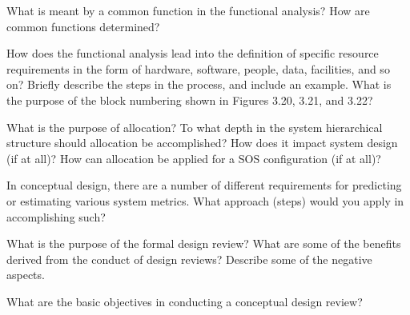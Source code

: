 \begin{exercises}
    \begin{exercise}
    \label{sea-03-19}
        What is meant by a common function in the functional analysis? How are common functions determined? 
    \end{exercise}
    \begin{solution}
    \end{solution}
    
    \begin{exercise}
    \label{sea-03-20}
        How does the functional analysis lead into the definition of specific resource requirements in the form of hardware, software, people, data, facilities, and so on? Briefly describe the steps in the process, and include an example. What is the purpose of the block numbering shown in Figures 3.20, 3.21, and 3.22?
    \end{exercise}
    \begin{solution}
    \end{solution}
    
    \begin{exercise}
    \label{sea-03-21}
        What is the purpose of allocation? To what depth in the system hierarchical structure should allocation be accomplished? How does it impact system design (if at all)? How can allocation be applied for a SOS configuration (if at all)? 
    \end{exercise}
    \begin{solution}
    \end{solution}
    
    \begin{exercise}
    \label{sea-03-22}
        In conceptual design, there are a number of different requirements for predicting or estimating various system metrics. What approach (steps) would you apply in accomplishing such?
    \end{exercise}
    \begin{solution}
    \end{solution}
    
    \begin{exercise}
    \label{sea-03-23}
        What is the purpose of the formal design review? What are some of the benefits derived from the conduct of design reviews? Describe some of the negative aspects.
    \end{exercise}
    \begin{solution}
    \end{solution}
    
    \begin{exercise}
    \label{sea-03-24}
        What are the basic objectives in conducting a conceptual design review?
    \end{exercise}
    \begin{solution}
    \end{solution}
\end{exercises}
